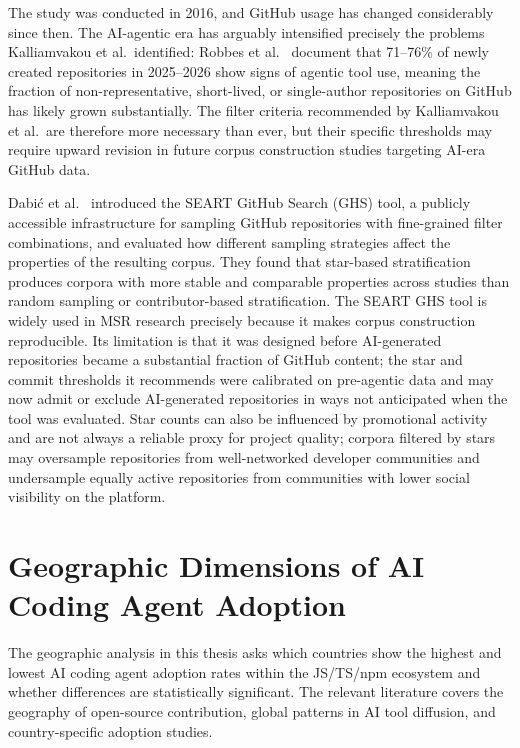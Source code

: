 The study was conducted in 2016, and GitHub usage has changed considerably since
then. The AI-agentic era has arguably intensified precisely the problems
Kalliamvakou et al.\ identified: Robbes et al.~\cite{robbesAgenticVery2026}
document that 71--76\% of newly created repositories in 2025--2026 show signs of
agentic tool use, meaning the fraction of non-representative, short-lived, or
single-author repositories on GitHub has likely grown substantially. The filter
criteria recommended by Kalliamvakou et al.\ are therefore more necessary than
ever, but their specific thresholds may require upward revision in future corpus
construction studies targeting AI-era GitHub data.

Dabi\'c et al.~\cite{dabic2021} introduced the SEART GitHub Search (GHS) tool,
a publicly accessible infrastructure for sampling GitHub repositories with
fine-grained filter combinations, and evaluated how different sampling strategies
affect the properties of the resulting corpus. They found that star-based
stratification produces corpora with more stable and comparable properties across
studies than random sampling or contributor-based stratification. The SEART GHS
tool is widely used in MSR research precisely because it makes corpus construction
reproducible. Its limitation is that it was designed before AI-generated repositories
became a substantial fraction of GitHub content; the star and commit thresholds it
recommends were calibrated on pre-agentic data and may now admit or exclude
AI-generated repositories in ways not anticipated when the tool was evaluated.
Star counts can also be influenced by promotional activity and are not always a
reliable proxy for project quality; corpora filtered by stars may oversample
repositories from well-networked developer communities and undersample equally
active repositories from communities with lower social visibility on the platform.

\section{Geographic Dimensions of AI Coding Agent Adoption}
\label{sec:lr:geography}

The geographic analysis in this thesis asks which countries show the highest and
lowest AI coding agent adoption rates within the JS/TS/npm ecosystem and whether
differences are statistically significant. The relevant literature covers the
geography of open-source contribution, global patterns in AI tool diffusion, and
country-specific adoption studies.

